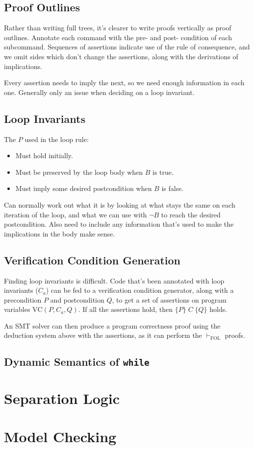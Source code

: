 \documentclass[a4paper, 11pt]{article}
\newcommand{\triple}[3]{\{#1\}\;#2\;\{#3\}}
\newcommand{\triplem}[3]{\(\triple{#1}{#2}{#3}\)}
\begin{document}
{    \subsection*{Proof Outlines}
    {
        Rather than writing full trees, it's clearer to write proofs vertically as proof outlines. Annotate each command with the pre- and post- condition of each subcommand. Sequences of assertions indicate use of the rule of consequence, and we omit sides which don't change the assertions, along with the derivations of implications.

        Every assertion needs to imply the next, so we need enough information in each one. Generally only an issue when deciding on a loop invariant.
    }
    \subsection*{Loop Invariants}
    {
        The \(P\) used in the loop rule:
        \begin{itemize}
        \item Must hold initially.
        \item Must be preserved by the loop body when \(B\) is true.
        \item Must imply some desired postcondition when \(B\) is false.
        \end{itemize}

        Can normally work out what it is by looking at what stays the same on each iteration of the loop, and what we can use with \(\neg B\) to reach the desired postcondition. Also need to include any information that's used to make the implications in the body make sense.
    }
    \subsection*{Verification Condition Generation}
    {
        Finding loop invariants is difficult. Code that's been annotated with loop invariants (\(C_a\)) can be fed to a verification condition generator, along with a precondition \(P\) and postcondition \(Q\), to get a set of assertions on program variables \(\text{VC}(P,C_a,Q)\). If all the assertions hold, then \triplem{P}{C}{Q} holds.

        An SMT solver can then produce a program correctness proof using the deduction system above with the assertions, as it can perform the \(\vdash_\text{FOL}\) proofs.
    }
    \subsection*{Dynamic Semantics of \texttt{while}}
    {

    }
}
\section*{Separation Logic}
{

}
\section*{Model Checking}
{

}
\end{document}
